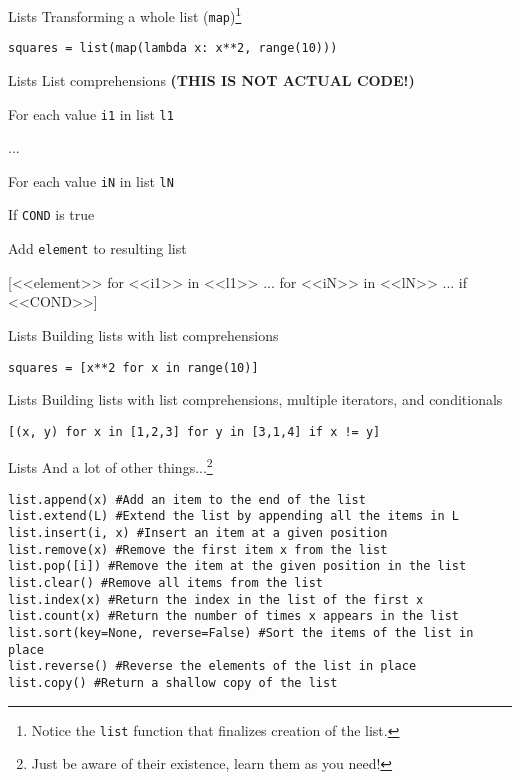 \documentclass{beamer}
\begin{document}
\begin{frame}[fragile]{Lists}
Transforming a whole list (\texttt{map})\footnote{Notice the \texttt{list} function that finalizes creation of the list.}
\begin{lstlisting}
squares = list(map(lambda x: x**2, range(10)))
\end{lstlisting}
\end{frame}

\begin{frame}[fragile]{Lists}
List comprehensions \textbf{(THIS IS NOT ACTUAL CODE!)}
\begin{codewithblock}{\item For each value \texttt{i1} in list \texttt{l1} \item ... \item For each value \texttt{iN} in list \texttt{lN} \item If \texttt{COND} is true \item Add \texttt{element} to resulting list}
[<<element>> for <<i1>> in <<l1>> ... for <<iN>> in <<lN>> ... if <<COND>>]
\end{codewithblock}
\end{frame}

\begin{frame}[fragile]{Lists}
Building lists with list comprehensions
\begin{lstlisting}
squares = [x**2 for x in range(10)]
\end{lstlisting}
\end{frame}

\begin{frame}[fragile]{Lists}
Building lists with list comprehensions, multiple iterators, and conditionals
\begin{lstlisting}
[(x, y) for x in [1,2,3] for y in [3,1,4] if x != y]
\end{lstlisting}
\end{frame}

\begin{frame}[fragile]{Lists}
And a lot of other things...\footnote{Just be aware of their existence, learn them as you need!}
\begin{lstlisting}
list.append(x) #Add an item to the end of the list
list.extend(L) #Extend the list by appending all the items in L
list.insert(i, x) #Insert an item at a given position
list.remove(x) #Remove the first item x from the list
list.pop([i]) #Remove the item at the given position in the list
list.clear() #Remove all items from the list
list.index(x) #Return the index in the list of the first x
list.count(x) #Return the number of times x appears in the list
list.sort(key=None, reverse=False) #Sort the items of the list in place
list.reverse() #Reverse the elements of the list in place
list.copy() #Return a shallow copy of the list
\end{lstlisting}
\end{frame}
\end{document}
